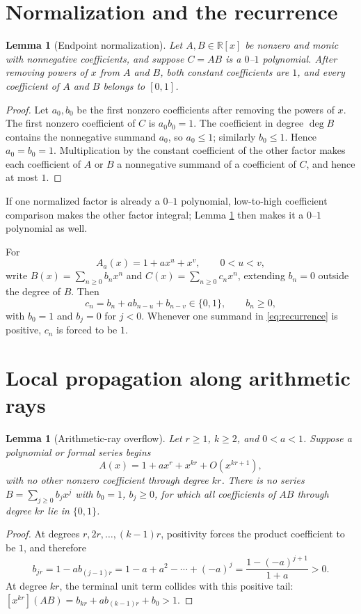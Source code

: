 \documentclass[11pt]{article}
\newtheorem{lemma}[theorem]{Lemma}
\theoremstyle{remark}
\numberwithin{equation}{section}
\begin{document}
\section{Normalization and the recurrence}

\begin{lemma}[Endpoint normalization]\label{lem:normalization}
Let $A,B\in\mathbb R[x]$ be nonzero and monic with nonnegative coefficients,
and suppose $C=AB$ is a $0$--$1$ polynomial.  After removing powers of $x$
from $A$ and $B$, both constant coefficients are $1$, and every coefficient
of $A$ and $B$ belongs to $[0,1]$.
\end{lemma}
\begin{proof}
Let $a_0,b_0$ be the first nonzero coefficients after removing the powers of
$x$.  The first nonzero coefficient of $C$ is $a_0b_0=1$.  The coefficient in
degree $\deg B$ contains the nonnegative summand $a_0$, so $a_0\leq1$;
similarly $b_0\leq1$.  Hence $a_0=b_0=1$.  Multiplication by the constant
coefficient of the other factor makes each coefficient of $A$ or $B$ a
nonnegative summand of a coefficient of $C$, and hence at most $1$.
\end{proof}

If one normalized factor is already a $0$--$1$ polynomial, low-to-high
coefficient comparison makes the other factor integral; Lemma
\ref{lem:normalization} then makes it a $0$--$1$ polynomial as well.

For
\[
 A_a(x)=1+a x^u+x^v,\qquad 0<u<v,
\]
write $B(x)=\sum_{n\ge0}b_nx^n$ and $C(x)=\sum_{n\ge0}c_nx^n$, extending
$b_n=0$ outside the degree of $B$.  Then
\begin{equation}\label{eq:recurrence}
 c_n=b_n+a b_{n-u}+b_{n-v}\in\{0,1\},\qquad b_n\ge0,
\end{equation}
with $b_0=1$ and $b_j=0$ for $j<0$.  Whenever one summand in
\eqref{eq:recurrence} is positive, $c_n$ is forced to be $1$.

\section{Local propagation along arithmetic rays}

\begin{lemma}[Arithmetic-ray overflow]\label{lem:overflow}
Let $r\ge1$, $k\ge2$, and $0<a<1$.  Suppose a polynomial or formal series
begins
\[
 A(x)=1+a x^r+x^{kr}+O(x^{kr+1}),
\]
with no other nonzero coefficient through degree $kr$.  There is no series
$B=\sum_{j\ge0}b_jx^j$ with $b_0=1$, $b_j\ge0$, for which all coefficients of
$AB$ through degree $kr$ lie in $\{0,1\}$.
\end{lemma}
\begin{proof}
At degrees $r,2r,\ldots,(k-1)r$, positivity forces the product coefficient to
be $1$, and therefore
\[
 b_{jr}=1-a b_{(j-1)r}=1-a+a^2-\cdots+(-a)^j
       =\frac{1-(-a)^{j+1}}{1+a}>0.
\]
At degree $kr$, the terminal unit term collides with this positive tail:
$[x^{kr}](AB)=b_{kr}+a b_{(k-1)r}+b_0>1$.
\end{proof}
\end{document}
